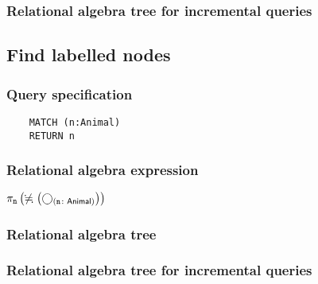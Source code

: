	\subsubsection*{Relational algebra tree for incremental queries}

	\subsection{Find labelled nodes}

	\subsubsection*{Query specification}

	\begin{lstlisting}
	MATCH (n:Animal)
	RETURN n
	\end{lstlisting}


	\subsubsection*{Relational algebra expression}

	$\projection{\var{n}} \left(\alldifferent{} \left(\getvertices{n}{Animal}\right)\right)$

	\subsubsection*{Relational algebra tree}


	\subsubsection*{Relational algebra tree for incremental queries}

